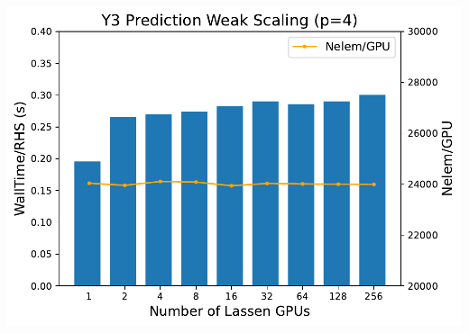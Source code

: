 \begin{frame}
\begin{minipage}{0.49\textwidth}
      \vspace{10pt}
    \includegraphics[width=.8\textwidth]{Figures/mtc/y3-prediction_weak_scaling.pdf}
  \end{minipage}
\end{frame}


